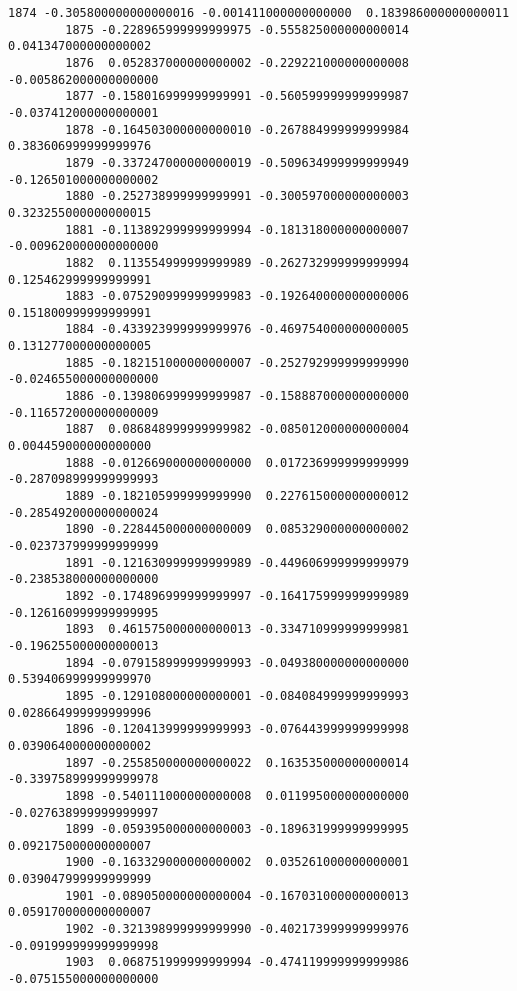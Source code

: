 \documentclass[11pt]{article}
\begin{document}
\begin{Verbatim}[commandchars=\\\{\}]
        1874 -0.305800000000000016 -0.001411000000000000  0.183986000000000011   
        1875 -0.228965999999999975 -0.555825000000000014  0.041347000000000002   
        1876  0.052837000000000002 -0.229221000000000008 -0.005862000000000000   
        1877 -0.158016999999999991 -0.560599999999999987 -0.037412000000000001   
        1878 -0.164503000000000010 -0.267884999999999984  0.383606999999999976   
        1879 -0.337247000000000019 -0.509634999999999949 -0.126501000000000002   
        1880 -0.252738999999999991 -0.300597000000000003  0.323255000000000015   
        1881 -0.113892999999999994 -0.181318000000000007 -0.009620000000000000   
        1882  0.113554999999999989 -0.262732999999999994  0.125462999999999991   
        1883 -0.075290999999999983 -0.192640000000000006  0.151800999999999991   
        1884 -0.433923999999999976 -0.469754000000000005  0.131277000000000005   
        1885 -0.182151000000000007 -0.252792999999999990 -0.024655000000000000   
        1886 -0.139806999999999987 -0.158887000000000000 -0.116572000000000009   
        1887  0.086848999999999982 -0.085012000000000004  0.004459000000000000   
        1888 -0.012669000000000000  0.017236999999999999 -0.287098999999999993   
        1889 -0.182105999999999990  0.227615000000000012 -0.285492000000000024   
        1890 -0.228445000000000009  0.085329000000000002 -0.023737999999999999   
        1891 -0.121630999999999989 -0.449606999999999979 -0.238538000000000000   
        1892 -0.174896999999999997 -0.164175999999999989 -0.126160999999999995   
        1893  0.461575000000000013 -0.334710999999999981 -0.196255000000000013   
        1894 -0.079158999999999993 -0.049380000000000000  0.539406999999999970   
        1895 -0.129108000000000001 -0.084084999999999993  0.028664999999999996   
        1896 -0.120413999999999993 -0.076443999999999998  0.039064000000000002   
        1897 -0.255850000000000022  0.163535000000000014 -0.339758999999999978   
        1898 -0.540111000000000008  0.011995000000000000 -0.027638999999999997   
        1899 -0.059395000000000003 -0.189631999999999995  0.092175000000000007   
        1900 -0.163329000000000002  0.035261000000000001  0.039047999999999999   
        1901 -0.089050000000000004 -0.167031000000000013  0.059170000000000007   
        1902 -0.321398999999999990 -0.402173999999999976 -0.091999999999999998   
        1903  0.068751999999999994 -0.474119999999999986 -0.075155000000000000   
        

\end{Verbatim}
\end{document}

